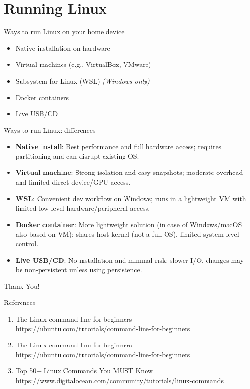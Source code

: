 \documentclass{beamer}
\begin{document}
\section{Running Linux}

\begin{frame}{Ways to run Linux on your home device}
  \begin{itemize}
    \item Native installation on hardware
    \item Virtual machines (e.g., VirtualBox, VMware)
    \item Subsystem for Linux (WSL) \textit{(Windows only)} 
    \item Docker containers
    \item Live USB/CD
  \end{itemize}
\end{frame}

\begin{frame}{Ways to run Linux: differences}
  \begin{itemize}
    \item \textbf{Native install}: Best performance and full hardware access; requires partitioning and can disrupt existing OS.
    \item \textbf{Virtual machine}: Strong isolation and easy snapshots; moderate overhead and limited direct device/GPU access.
    \item \textbf{WSL}: Convenient dev workflow on Windows; runs in a lightweight VM with limited low-level hardware/peripheral access.
    \item \textbf{Docker container}: More lightweight solution (in case of Windows/macOS also based on VM); shares host kernel (not a full OS), limited system-level control.
    \item \textbf{Live USB/CD}: No installation and minimal risk; slower I/O, changes may be non-persistent unless using persistence.
  \end{itemize}
\end{frame}

\begin{frame}
    \centering
    \Huge{Thank You!}
\end{frame}

\begin{frame}{References}
  \begin{enumerate}
    \item The Linux command line for beginners \href{https://ubuntu.com/tutorials/command-line-for-beginners}{https://ubuntu.com/tutorials/command-line-for-beginners}
    \item The Linux command line for beginners \href{https://ubuntu.com/tutorials/command-line-for-beginners}{https://ubuntu.com/tutorials/command-line-for-beginners}
    \item Top 50+ Linux Commands You MUST Know \href{https://www.digitalocean.com/community/tutorials/linux-commands}{https://www.digitalocean.com/community/tutorials/linux-commands}
  \end{enumerate}
\end{frame}
\end{document}

